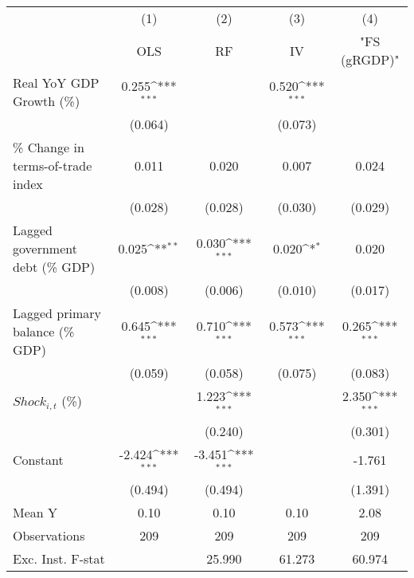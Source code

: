 {
\def\sym#1{\ifmmode^{#1}\else\(^{#1}\)\fi}
\begin{tabular}{l*{4}{c}}
\toprule
                    &\multicolumn{1}{c}{(1)}&\multicolumn{1}{c}{(2)}&\multicolumn{1}{c}{(3)}&\multicolumn{1}{c}{(4)}\\
                    &\multicolumn{1}{c}{OLS}&\multicolumn{1}{c}{RF}&\multicolumn{1}{c}{IV}&\multicolumn{1}{c}{ "FS (gRGDP)" }\\
\midrule
Real YoY GDP Growth (\%)&       0.255\sym{***}&                     &       0.520\sym{***}&                     \\
                    &     (0.064)         &                     &     (0.073)         &                     \\
\addlinespace
\% Change in terms-of-trade index&       0.011         &       0.020         &       0.007         &       0.024         \\
                    &     (0.028)         &     (0.028)         &     (0.030)         &     (0.029)         \\
\addlinespace
Lagged government debt (\% GDP)&       0.025\sym{**} &       0.030\sym{***}&       0.020\sym{*}  &       0.020         \\
                    &     (0.008)         &     (0.006)         &     (0.010)         &     (0.017)         \\
\addlinespace
Lagged primary balance (\% GDP)&       0.645\sym{***}&       0.710\sym{***}&       0.573\sym{***}&       0.265\sym{***}\\
                    &     (0.059)         &     (0.058)         &     (0.075)         &     (0.083)         \\
\addlinespace
$ Shock_{i,t}$ (\%) &                     &       1.223\sym{***}&                     &       2.350\sym{***}\\
                    &                     &     (0.240)         &                     &     (0.301)         \\
\addlinespace
Constant            &      -2.424\sym{***}&      -3.451\sym{***}&                     &      -1.761         \\
                    &     (0.494)         &     (0.494)         &                     &     (1.391)         \\
\midrule
Mean Y              &        0.10         &        0.10         &        0.10         &        2.08         \\
Observations        &         209         &         209         &         209         &         209         \\
Exc. Inst. F-stat   &                     &      25.990         &      61.273         &      60.974         \\
\bottomrule
\end{tabular}
}
